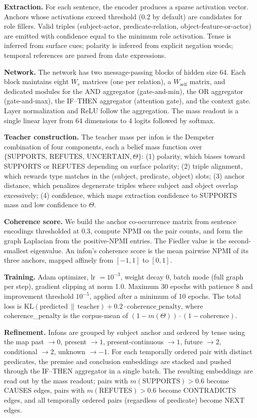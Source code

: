 \documentclass[11pt,a4paper]{article}
\begin{document}
\textbf{Extraction.} For each sentence, the encoder produces a
sparse activation vector. Anchors whose activations exceed
threshold (0.2 by default) are candidates for role fillers.
Valid triples (subject-actor, predicate-relation,
object-feature-or-actor) are emitted with confidence equal to
the minimum role activation. Tense is inferred from surface
cues; polarity is inferred from explicit negation words;
temporal references are parsed from date expressions.

\textbf{Network.} The network has two message-passing blocks
of hidden size 64. Each block maintains eight $W_r$ matrices
(one per relation), a $W_{\text{self}}$ matrix, and dedicated
modules for the AND aggregator (gate-and-min), the OR
aggregator (gate-and-max), the IF--THEN aggregator (attention
gate), and the context gate. Layer normalization and ReLU
follow the aggregation. The mass readout is a single linear
layer from 64 dimensions to 4 logits followed by softmax.

\textbf{Teacher construction.} The teacher mass per infon is
the Dempster combination of four components, each a belief
mass function over $\{\text{SUPPORTS, REFUTES, UNCERTAIN},
\Theta\}$: (1) polarity, which biases toward SUPPORTS or
REFUTES depending on surface polarity; (2) triple alignment,
which rewards type matches in the (subject, predicate,
object) slots; (3) anchor distance, which penalizes
degenerate triples where subject and object overlap
excessively; (4) confidence, which maps extraction confidence
to SUPPORTS mass and low confidence to $\Theta$.

\textbf{Coherence score.} We build the anchor co-occurrence
matrix from sentence encodings thresholded at 0.3, compute
NPMI on the pair counts, and form the graph Laplacian from
the positive-NPMI entries. The Fiedler value is the
second-smallest eigenvalue. An infon's coherence score is
the mean pairwise NPMI of its three anchors, mapped affinely
from $[-1, 1]$ to $[0, 1]$.

\textbf{Training.} Adam optimizer, lr $=10^{-3}$, weight
decay 0, batch mode (full graph per step), gradient clipping
at norm 1.0. Maximum 30 epochs with patience 8 and
improvement threshold $10^{-5}$, applied after a minimum of
10 epochs. The total loss is
$\mathrm{KL}(\text{predicted}\,\|\,\text{teacher}) + 0.2
\cdot \text{coherence\_penalty}$, where coherence\_penalty is
the corpus-mean of $(1 - m(\Theta)) \cdot (1 -
\text{coherence})$.

\textbf{Refinement.} Infons are grouped by subject anchor and
ordered by tense using the map past $\to 0$, present $\to 1$,
present-continuous $\to 1$, future $\to 2$, conditional $\to
2$, unknown $\to -1$. For each temporally ordered pair with
distinct predicates, the premise and conclusion embeddings
are stacked and pushed through the IF--THEN aggregator in a
single batch. The resulting embeddings are read out by the
mass readout; pairs with $m(\text{SUPPORTS}) > 0.6$ become
CAUSES edges, pairs with $m(\text{REFUTES}) > 0.6$ become
CONTRADICTS edges, and all temporally ordered pairs
(regardless of predicate) become NEXT edges.
\end{document}
